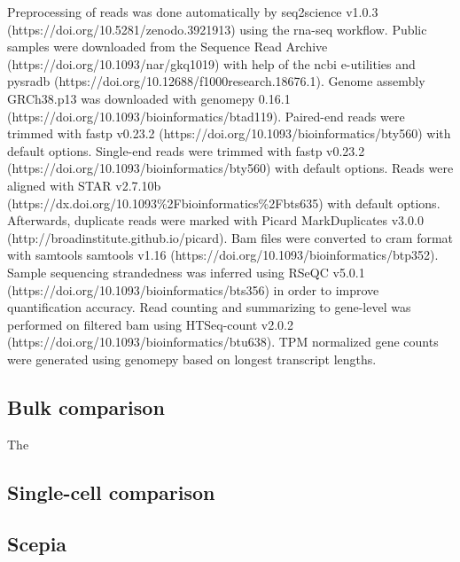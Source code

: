 Preprocessing of reads was done automatically by seq2science v1.0.3 (https://doi.org/10.5281/zenodo.3921913) using the rna-seq workflow. Public samples were downloaded from the Sequence Read Archive (https://doi.org/10.1093/nar/gkq1019) with help of the ncbi e-utilities and pysradb (https://doi.org/10.12688/f1000research.18676.1). Genome assembly GRCh38.p13 was downloaded with genomepy 0.16.1 (https://doi.org/10.1093/bioinformatics/btad119). Paired-end reads were trimmed with fastp v0.23.2 (https://doi.org/10.1093/bioinformatics/bty560) with default options. Single-end reads were trimmed with fastp v0.23.2 (https://doi.org/10.1093/bioinformatics/bty560) with default options. Reads were aligned with STAR v2.7.10b (https://dx.doi.org/10.1093\%2Fbioinformatics\%2Fbts635) with default options. Afterwards, duplicate reads were marked with Picard MarkDuplicates v3.0.0 (http://broadinstitute.github.io/picard). Bam files were converted to cram format with samtools samtools v1.16 (https://doi.org/10.1093/bioinformatics/btp352). Sample sequencing strandedness was inferred using RSeQC v5.0.1 (https://doi.org/10.1093/bioinformatics/bts356) in order to improve quantification accuracy. Read counting and summarizing to gene-level was performed on filtered bam using HTSeq-count v2.0.2 (https://doi.org/10.1093/bioinformatics/btu638). TPM normalized gene counts were generated using genomepy based on longest transcript lengths.

\subsection{Bulk comparison}

The 

\subsection{Single-cell comparison}


\subsection{Scepia}

